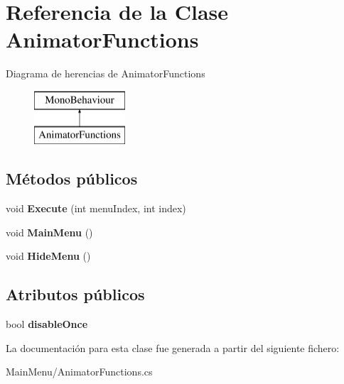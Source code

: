 \hypertarget{class_animator_functions}{}\section{Referencia de la Clase Animator\+Functions}
\label{class_animator_functions}
Diagrama de herencias de Animator\+Functions\begin{figure}[H]
\begin{center}
\leavevmode
\includegraphics[height=2.000000cm]{class_animator_functions}
\end{center}
\end{figure}
\subsection*{Métodos públicos}
\begin{DoxyCompactItemize}
\item 
\mbox{\label{class_animator_functions_a50aa001c6ad05867751979b8e7f0abf8}} 
void {\bfseries Execute} (int menu\+Index, int index)
\item 
\mbox{\label{class_animator_functions_a414db2e5825d7eeb07f8c1bc12b752eb}} 
void {\bfseries Main\+Menu} ()
\item 
\mbox{\label{class_animator_functions_a70a35e4c8e707f3ac7a9797173c38065}} 
void {\bfseries Hide\+Menu} ()
\end{DoxyCompactItemize}
\subsection*{Atributos públicos}
\begin{DoxyCompactItemize}
\item 
\mbox{\label{class_animator_functions_ae073671e7de37bce6a88df30ce177150}} 
bool {\bfseries disable\+Once}
\end{DoxyCompactItemize}


La documentación para esta clase fue generada a partir del siguiente fichero\+:\begin{DoxyCompactItemize}
\item 
Main\+Menu/Animator\+Functions.\+cs\end{DoxyCompactItemize}
